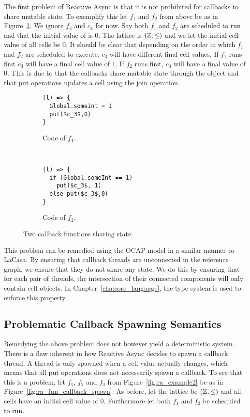 The first problem of Reactive Async is that it is not prohibited for callbacks
to share mutable state. To exemplify this let $f_1$ and $f_2$ from above be as
in Figure~\ref{fig:ra_fun_shared_state}. We ignore $f_3$ and $c_4$ for now. 
Say both $f_1$ and $f_2$ are scheduled to run and that the initial value of
 is $0$.  The lattice is $(\mathbb{Z}, \leq)$ and we let the
initial cell value of all cells be $0$.  It should be clear that depending on
the order in which $f_1$ and $f_2$ are scheduled to execute, $c_3$ will have 
different final cell values. If $f_1$ runs first $c_3$ will have a final cell
value of $1$. If $f_2$ runs first, $c_3$ will have a final value of $0$. This is
due to that the callbacks share mutable state through the  object
and that put operations updates a cell using the join operation.

\begin{figure}
  \begin{subfigure}[b]{0.5\textwidth}
    \begin{lstlisting}
(l) => {
  Global.someInt = 1
  put($c_3$,0)
}
    \end{lstlisting}
    \caption{Code of $f_1$.}
  \end{subfigure}
  ~
  \begin{subfigure}[b]{0.5\textwidth}
    \begin{lstlisting}
(l) => {
  if (Global.someInt == 1)
    put($c_3$, 1)
  else put($c_3$,0)
}
    \end{lstlisting}
    \caption{Code of $f_2$.}
  \end{subfigure}
  \caption{Two callback functions sharing state.}
  \label{fig:ra_fun_shared_state}
\end{figure}

This problem can be remedied using the OCAP model in a similar manner to LaCasa.
By ensuring that callback threads are unconnected in the reference graph, we ensure
that they do not share any state. We do this by ensuring that for each pair of
threads, the intersection of their connected components will only contain cell
objects. In Chapter~\ref{cha:core_language}, the type system is used to enforce
this property.

\subsection{Problematic Callback Spawning Semantics}%
\label{sub:problematic_callback_spawning_semantics}

Remedying the above problem does not however yield a deterministic system.
There is a flaw inherent in how Reactive Async decides to spawn a callback
thread. A thread is only spawned when a cell value actually changes, which means
that all put operations does not necessarily spawn a callback. To see that this
is a problem, let $f_1$, $f_2$ and $f_3$ from Figure~\ref{fig:ra_example2} be as in
Figure~\ref{fig:ra_fun_callback_spawn}. As before, let the lattice be
$(\mathbb{Z}, \leq)$ and all cells have an initial cell value of $0$. Furthermore
let both $f_1$ and $f_2$ be scheduled to run.

